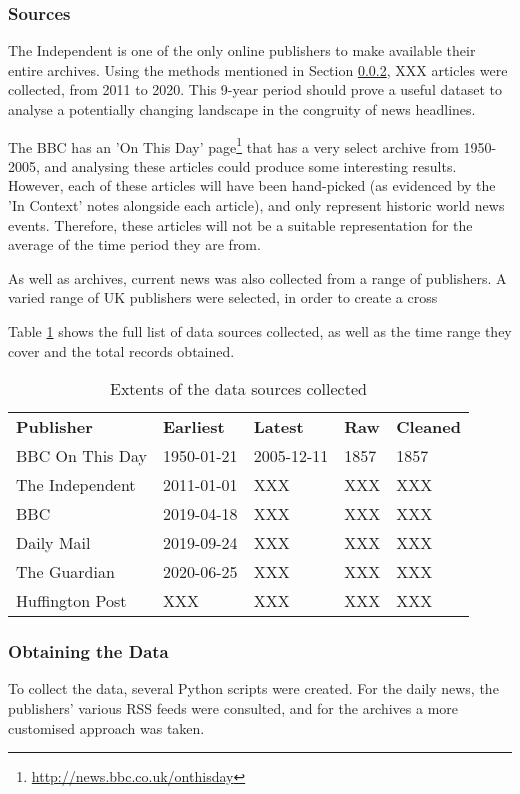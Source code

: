 \subsubsection{Sources}
The Independent is one of the only online publishers to make available their entire archives. Using the methods mentioned in Section \ref{obtaining-data}, XXX articles were collected, from 2011 to 2020. This 9-year period should prove a useful dataset to analyse a potentially changing landscape in the congruity of news headlines.

The BBC has an 'On This Day' page\footnote{\url{http://news.bbc.co.uk/onthisday}} that has a very select archive from 1950-2005, and analysing these articles could produce some interesting results. However, each of these articles will have been hand-picked (as evidenced by the 'In Context' notes alongside each article), and only represent historic world news events. Therefore, these articles will not be a suitable representation for the average of the time period they are from.

As well as archives, current news was also collected from a range of publishers. A varied range of UK publishers were selected, in order to create a cross

Table \ref{tab:data-sources} shows the full list of data sources collected, as well as the time range they cover and the total records obtained.

\begin{table}[h]
\begin{tabular}{lllll}
\textbf{Publisher} & \textbf{Earliest} & \textbf{Latest} & \textbf{Raw} & \textbf{Cleaned} \\
BBC On This Day & 1950-01-21 & 2005-12-11 & 1857 & 1857 \\
The Independent & 2011-01-01 & XXX & XXX & XXX  \\
BBC & 2019-04-18 & XXX & XXX & XXX  \\
Daily Mail & 2019-09-24 & XXX & XXX & XXX \\
The Guardian & 2020-06-25 & XXX & XXX & XXX \\
Huffington Post & XXX & XXX & XXX & XXX \\
\end{tabular}
\caption{Extents of the data sources collected}
\label{tab:data-sources}
\end{table}

\subsubsection{Obtaining the Data} \label{obtaining-data}
To collect the data, several Python scripts were created. For the daily news, the publishers' various RSS feeds were consulted, and for the archives a more customised approach was taken.

